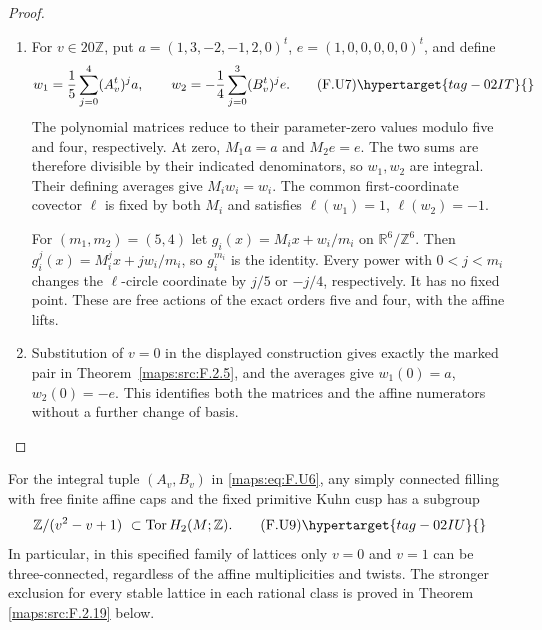 \begin{proof}
\begin{enumerate}[label={$\langle1\rangle$\arabic*.}]
\item For $v\in20\mathbb Z$, put
$a=(1,3,-2,-1,2,0)^t$, $e=(1,0,0,0,0,0)^t$, and define
\[
 w_1=\frac15\sum_{j=0}^4(A_v^t)^j a,
 \qquad
 w_2=-\frac14\sum_{j=0}^3(B_v^t)^j e.
 \tag{F.U7}\hypertarget{tag-02IT}{}\label{maps:eq:F.U7}
\]
The polynomial matrices reduce to their parameter-zero
values modulo five and four, respectively. At zero,
$M_1a=a$ and $M_2e=e$. The two sums are therefore divisible
by their indicated denominators, so $w_1,w_2$ are integral.
Their defining averages give $M_iw_i=w_i$. The common
first-coordinate covector $\ell$ is fixed by both $M_i$ and
satisfies $\ell(w_1)=1$, $\ell(w_2)=-1$.

For $(m_1,m_2)=(5,4)$ let
$g_i(x)=M_ix+w_i/m_i$ on $\mathbb R^6/\mathbb Z^6$.
Then $g_i^j(x)=M_i^jx+jw_i/m_i$, so $g_i^{m_i}$ is the
identity. Every power with $0<j<m_i$ changes the $\ell$-circle coordinate by $j/5$ or $-j/4$, respectively.
It has no fixed point. These are free actions of the exact
orders five and four, with the affine lifts.

\item Substitution of $v=0$ in the displayed construction gives
exactly the marked pair in Theorem~\ref{maps:src:F.2.5}, and
the averages give $w_1(0)=a$, $w_2(0)=-e$. This identifies
both the matrices and the affine numerators without a further
change of basis.

\end{enumerate}
\end{proof}




\begin{proposition}\hypertarget{tag-02N6}{}\label{maps:src:F.2.17}


For the integral tuple $(A_v,B_v)$ in \eqref{maps:eq:F.U6}, any simply
connected filling with free finite affine caps and the fixed
primitive Kuhn cusp has a subgroup
\[
 \mathbb Z/(v^2-v+1)\ \subset\operatorname{Tor}H_2(M;\mathbb Z).
 \tag{F.U9}\hypertarget{tag-02IU}{}\label{maps:eq:F.U9}
\]
In particular, in this specified family of lattices only
$v=0$ and $v=1$ can be three-connected, regardless of the
affine multiplicities and twists.  The stronger exclusion for every stable lattice in each
rational class is proved in Theorem \ref{maps:src:F.2.19} below.

\end{proposition}


